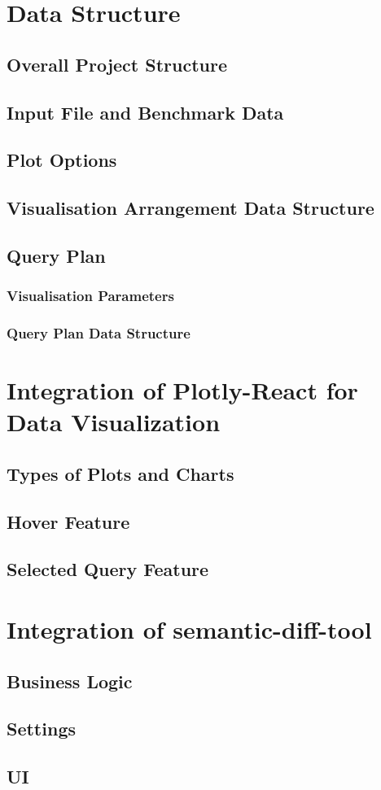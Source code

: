 \section{Data Structure}
\subsection{Overall Project Structure}
\subsection{Input File and Benchmark Data}
\subsection{Plot Options}
\subsection{Visualisation Arrangement Data Structure}
\subsection{Query Plan}
\subsubsection{Visualisation Parameters}
\subsubsection{Query Plan Data Structure}

\section{Integration of Plotly-React for Data Visualization}
\subsection{Types of Plots and Charts}
\subsection{Hover Feature}
\subsection{Selected Query Feature}

\section{Integration of semantic-diff-tool}
\subsection{Business Logic}
\subsection{Settings}
\subsection{UI}